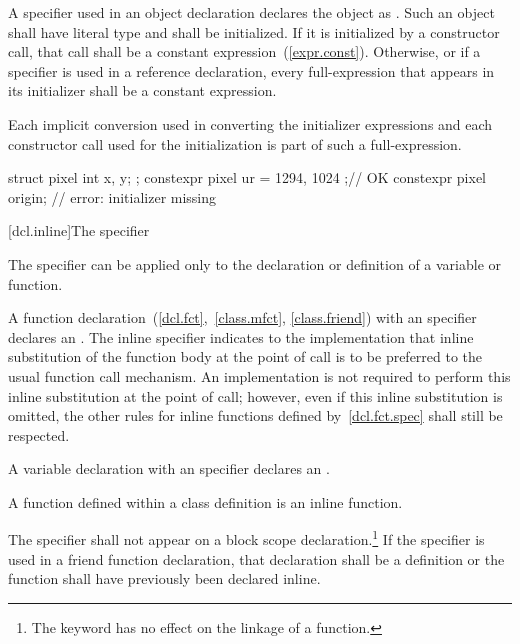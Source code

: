 \pnum
A  specifier used in an object
declaration declares the object as .
Such an object
shall have literal type and
shall be initialized.
If it is initialized by a constructor call,
that call shall be a constant expression~(\ref{expr.const}).
Otherwise,
or if a  specifier is used in a reference declaration,
every full-expression that appears in its initializer shall be a constant expression. \begin{note} Each
implicit conversion used in converting the initializer expressions and each constructor call
used for the initialization is part of such a full-expression. \end{note}
\begin{example}
\begin{codeblock}
struct pixel { 
  int x, y; 
}; 
constexpr pixel ur = { 1294, 1024 };// OK 
constexpr pixel origin;             // error: initializer missing 
\end{codeblock}
\end{example}

[dcl.inline]{The  specifier}%

\pnum
The  specifier can be applied only to the declaration
or definition of a variable or function.

\pnum
{}%
%
A function declaration~(\ref{dcl.fct},~\ref{class.mfct},
\ref{class.friend}) with an  specifier declares an
. The inline specifier indicates to
the implementation that inline substitution of the function body at the
point of call is to be preferred to the usual function call mechanism.
An implementation is not required to perform this inline substitution at
the point of call; however, even if this inline substitution is omitted,
the other rules for inline functions defined by~\ref{dcl.fct.spec} shall
still be respected.

\pnum
A variable declaration with an  specifier declares an
.

\pnum
A function defined within a class definition is an inline function.

\pnum
The  specifier shall not appear on a block scope
declaration.\footnote{The  keyword has no effect on the linkage of a function.}
If the  specifier is used in a friend function declaration, that
declaration shall be a definition or the function shall have previously
been declared inline.

